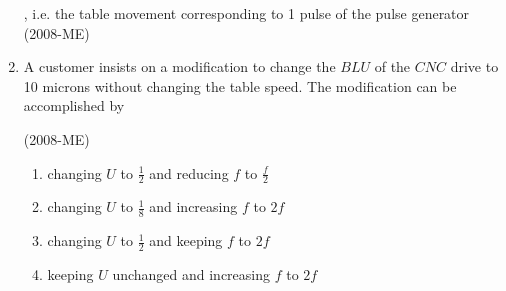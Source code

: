 \documentclass[journal]{IEEEtran}
\begin{document}
\begin{enumerate}
, i.e. the table movement corresponding to 1
 pulse of the pulse generator \label{84} \hfill(2008-ME)
 \begin{enumerate}
 \end{enumerate}
 \item A customer insists on a modification to change the $BLU$
 of the $CNC$
 drive to 10 microns without changing the table speed. The modification can be accomplished by \label{85} 

 \hfill(2008-ME)
 \begin{enumerate}
     \item changing $U$ to $\frac{1}{2}$ and reducing $f$ to $\frac{f}{2}$
     \item changing $U$ to $\frac{1}{8}$ and increasing $f$ to $2f$
     \item changing $U$ to $\frac{1}{2}$ and keeping $f$ to $2f$
     \item keeping  $U$ unchanged and increasing $f$ to $2f$
 \end{enumerate}
\end{enumerate}
\end{document}
